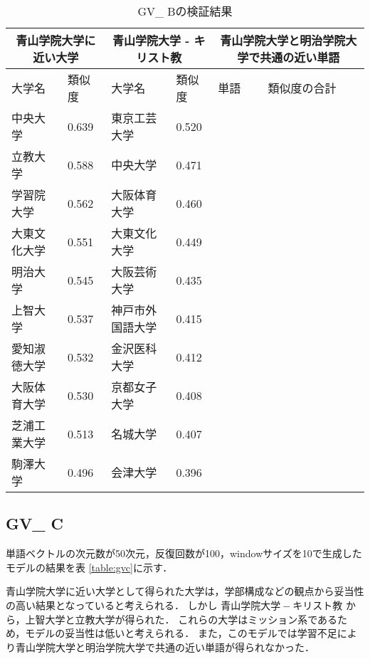 \begin{table}[H]
\caption{GV\_ Bの検証結果}
\centering
\footnotesize
\begin{tabular}{ll|ll|ll}
\hline
\multicolumn{2}{c}{青山学院大学に近い大学} & \multicolumn{2}{c}{青山学院大学 - キリスト教} & \multicolumn{2}{c}{青山学院大学と明治学院大学で共通の近い単語}
\\ \hline
大学名 & 類似度 & 大学名 & 類似度 & 単語 & 類似度の合計
\\ \hline \hline
中央大学 & 0.639 & 東京工芸大学 & 0.520 & & \\
立教大学 & 0.588 & 中央大学 & 0.471 & & \\
学習院大学 & 0.562 & 大阪体育大学 & 0.460 & & \\
大東文化大学 & 0.551 & 大東文化大学 & 0.449 & & \\
明治大学 & 0.545 & 大阪芸術大学 & 0.435 & & \\
上智大学 & 0.537 & 神戸市外国語大学 & 0.415 & & \\
愛知淑徳大学 & 0.532 & 金沢医科大学 & 0.412 & & \\
大阪体育大学 & 0.530 & 京都女子大学 & 0.408 & & \\
芝浦工業大学 & 0.513 & 名城大学 & 0.407 & & \\
駒澤大学 & 0.496 & 会津大学 & 0.396 & & \\ \hline
\end{tabular}
\label{table:gvb}
\end{table}

\subsection{GV\_ C}
単語ベクトルの次元数が50次元，反復回数が100，windowサイズを10で生成したモデルの結果を表 \ref{table:gvc}に示す．

青山学院大学に近い大学として得られた大学は，学部構成などの観点から妥当性の高い結果となっていると考えられる．
しかし $ 青山学院大学 - キリスト教 $ から，上智大学と立教大学が得られた．
これらの大学はミッション系であるため，モデルの妥当性は低いと考えられる．
また，このモデルでは学習不足により青山学院大学と明治学院大学で共通の近い単語が得られなかった．

